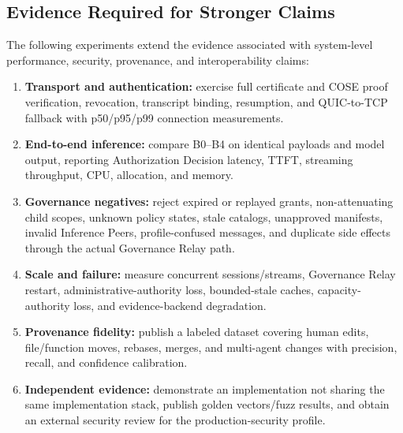 \documentclass[10pt]{article}
\begin{document}
\subsection{Evidence Required for Stronger Claims}

The following experiments extend the evidence associated with system-level performance, security, provenance, and interoperability claims:

\begin{enumerate}
  \item \textbf{Transport and authentication:} exercise full certificate and COSE proof verification, revocation, transcript binding, resumption, and QUIC-to-TCP fallback with p50/p95/p99 connection measurements.
  \item \textbf{End-to-end inference:} compare B0--B4 on identical payloads and model output, reporting Authorization Decision latency, TTFT, streaming throughput, CPU, allocation, and memory.
  \item \textbf{Governance negatives:} reject expired or replayed grants, non-attenuating child scopes, unknown policy states, stale catalogs, unapproved manifests, invalid Inference Peers, profile-confused messages, and duplicate side effects through the actual Governance Relay path.
  \item \textbf{Scale and failure:} measure concurrent sessions/streams, Governance Relay restart, administrative-authority loss, bounded-stale caches, capacity-authority loss, and evidence-backend degradation.
  \item \textbf{Provenance fidelity:} publish a labeled dataset covering human edits, file/function moves, rebases, merges, and multi-agent changes with precision, recall, and confidence calibration.
  \item \textbf{Independent evidence:} demonstrate an implementation not sharing the same implementation stack, publish golden vectors/fuzz results, and obtain an external security review for the production-security profile.
\end{enumerate}
\end{document}
